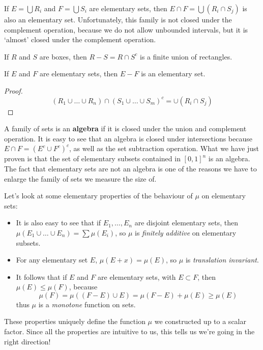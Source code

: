 If $E = \bigcup R_i$ and $F = \bigcup S_i$ are elementary sets, then $E \cap F = \bigcup (R_i \cap S_j)$ is also an elementary set. Unfortunately, this family is not closed under the complement operation, because we do not allow unbounded intervals, but it is `almost' closed under the complement operation.

\begin{lemma}
    If $R$ and $S$ are boxes, then $R - S = R \cap S^c$ is a finite union of rectangles.
\end{lemma}

\begin{corollary}
    If $E$ and $F$ are elementary sets, then $E - F$ is an elementary set.
\end{corollary}
\begin{proof}
    \[ (R_1 \cup \dots \cup R_n) \cap (S_1 \cup \dots \cup S_m)^c = \cup (R_i \cap S_j) \]
\end{proof}

A family of sets is an {\bf algebra} if it is closed under the union and complement operation. It is easy to see that an algebra is closed under intersections because $E \cap F = (E^c \cup F^c)^c$, as well as the set subtraction operation. What we have just proven is that the set of elementary subsets contained in $[0,1]^n$ is an algebra. The fact that elementary sets are not an algebra is one of the reasons we have to enlarge the family of sets we measure the size of.

Let's look at some elementary properties of the behaviour of $\mu$ on elementary sets:
%
\begin{itemize}
    \item It is also easy to see that if $E_1, \dots, E_n$ are disjoint elementary sets, then $\mu(E_1 \cup \dots \cup E_n) = \sum \mu(E_i)$, so $\mu$ is {\it finitely additive} on elementary subsets.

    \item For any elementary set $E$, $\mu(E + x) = \mu(E)$, so $\mu$ is {\it translation invariant}.

    \item It follows that if $E$ and $F$ are elementary sets, with $E \subset F$, then $\mu(E) \leq \mu(F)$, because
    \[ \mu(F) = \mu((F - E) \cup E) = \mu(F-E) + \mu(E) \geq \mu(E) \]
    thus $\mu$ is a {\it monotone} function on sets.
\end{itemize}
%
These properties uniquely define the function $\mu$ we constructed up to a scalar factor. Since all the properties are intuitive to us, this tells us we're going in the right direction!

